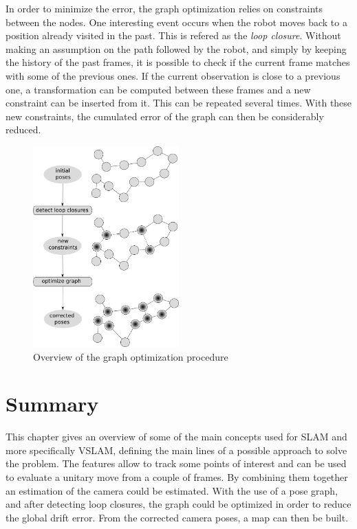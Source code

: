 In order to minimize the error, the graph optimization relies on constraints between the nodes. One interesting event occurs when the robot moves back to a position already visited in the past. This is refered as the \emph{loop closure}. Without making an assumption on the path followed by the robot, and simply by keeping the history of the past frames, it is possible to check if the current frame matches with some of the previous ones. If the current observation is close to a previous one, a transformation can be computed between these frames and a new constraint can be inserted from it. This can be repeated several times. With these new constraints, the cumulated error of the graph can then be considerably reduced. 

\begin{figure}[H]
\centering
\includegraphics[width=0.5\textwidth]{figures/graph1}
\caption{Overview of the graph optimization procedure}
\end{figure}

\section{Summary}

This chapter gives an overview of some of the main concepts used for \gls{SLAM} and more specifically \gls{VSLAM}, defining the main lines of a possible approach to solve the problem. The features allow to track some points of interest and can be used to evaluate a unitary move from a couple of frames. By combining them together an estimation of the camera could be estimated. With the use of a pose graph, and after detecting loop closures, the graph could be optimized in order to reduce the global drift error. From the corrected camera poses, a map can then be built. 

